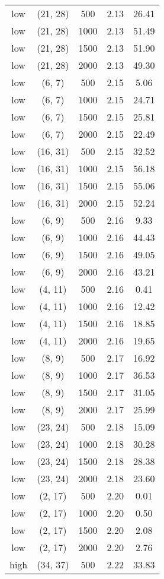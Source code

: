 \begin{tabular}{c c c c c}
low & (21, 28) &  500 & 2.13 & 26.41 \\
low & (21, 28) &  1000 & 2.13 & 51.49 \\
low & (21, 28) &  1500 & 2.13 & 51.90 \\
low & (21, 28) &  2000 & 2.13 & 49.30 \\
low & (6, 7) &  500 & 2.15 & 5.06 \\
low & (6, 7) &  1000 & 2.15 & 24.71 \\
low & (6, 7) &  1500 & 2.15 & 25.81 \\
low & (6, 7) &  2000 & 2.15 & 22.49 \\
low & (16, 31) &  500 & 2.15 & 32.52 \\
low & (16, 31) &  1000 & 2.15 & 56.18 \\
low & (16, 31) &  1500 & 2.15 & 55.06 \\
low & (16, 31) &  2000 & 2.15 & 52.24 \\
low & (6, 9) &  500 & 2.16 & 9.33 \\
low & (6, 9) &  1000 & 2.16 & 44.43 \\
low & (6, 9) &  1500 & 2.16 & 49.05 \\
low & (6, 9) &  2000 & 2.16 & 43.21 \\
low & (4, 11) &  500 & 2.16 & 0.41 \\
low & (4, 11) &  1000 & 2.16 & 12.42 \\
low & (4, 11) &  1500 & 2.16 & 18.85 \\
low & (4, 11) &  2000 & 2.16 & 19.65 \\
low & (8, 9) &  500 & 2.17 & 16.92 \\
low & (8, 9) &  1000 & 2.17 & 36.53 \\
low & (8, 9) &  1500 & 2.17 & 31.05 \\
low & (8, 9) &  2000 & 2.17 & 25.99 \\
low & (23, 24) &  500 & 2.18 & 15.09 \\
low & (23, 24) &  1000 & 2.18 & 30.28 \\
low & (23, 24) &  1500 & 2.18 & 28.38 \\
low & (23, 24) &  2000 & 2.18 & 23.60 \\
low & (2, 17) &  500 & 2.20 & 0.01 \\
low & (2, 17) &  1000 & 2.20 & 0.50 \\
low & (2, 17) &  1500 & 2.20 & 2.08 \\
low & (2, 17) &  2000 & 2.20 & 2.76 \\
high & (34, 37) &  500 & 2.22 & 33.83 \\

\end{tabular}
